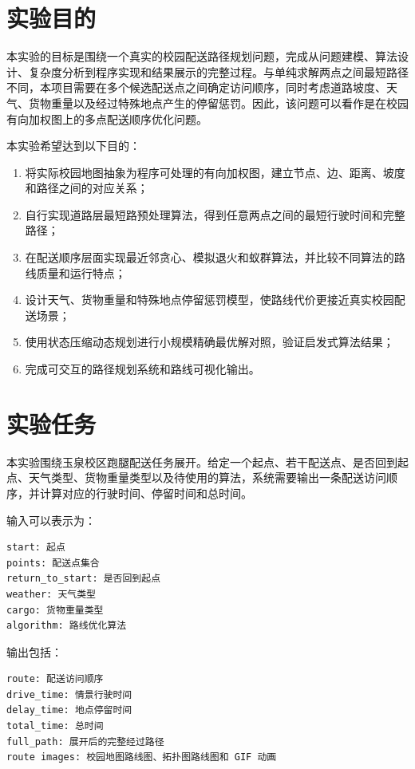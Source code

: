\documentclass[12pt,a4paper,UTF8]{article}
\begin{document}
\section{实验目的}

本实验的目标是围绕一个真实的校园配送路径规划问题，完成从问题建模、算法设计、复杂度分析到程序实现和结果展示的完整过程。与单纯求解两点之间最短路径不同，本项目需要在多个候选配送点之间确定访问顺序，同时考虑道路坡度、天气、货物重量以及经过特殊地点产生的停留惩罚。因此，该问题可以看作是在校园有向加权图上的多点配送顺序优化问题。

本实验希望达到以下目的：
\begin{enumerate}[label=(\arabic*)]
    \item 将实际校园地图抽象为程序可处理的有向加权图，建立节点、边、距离、坡度和路径之间的对应关系；
    \item 自行实现道路层最短路预处理算法，得到任意两点之间的最短行驶时间和完整路径；
    \item 在配送顺序层面实现最近邻贪心、模拟退火和蚁群算法，并比较不同算法的路线质量和运行特点；
    \item 设计天气、货物重量和特殊地点停留惩罚模型，使路线代价更接近真实校园配送场景；
    \item 使用状态压缩动态规划进行小规模精确最优解对照，验证启发式算法结果；
    \item 完成可交互的路径规划系统和路线可视化输出。
\end{enumerate}

\section{实验任务}

本实验围绕玉泉校区跑腿配送任务展开。给定一个起点、若干配送点、是否回到起点、天气类型、货物重量类型以及待使用的算法，系统需要输出一条配送访问顺序，并计算对应的行驶时间、停留时间和总时间。

输入可以表示为：
\begin{verbatim}
start: 起点
points: 配送点集合
return_to_start: 是否回到起点
weather: 天气类型
cargo: 货物重量类型
algorithm: 路线优化算法
\end{verbatim}

输出包括：
\begin{verbatim}
route: 配送访问顺序
drive_time: 情景行驶时间
delay_time: 地点停留时间
total_time: 总时间
full_path: 展开后的完整经过路径
route images: 校园地图路线图、拓扑图路线图和 GIF 动画
\end{verbatim}
\end{document}
